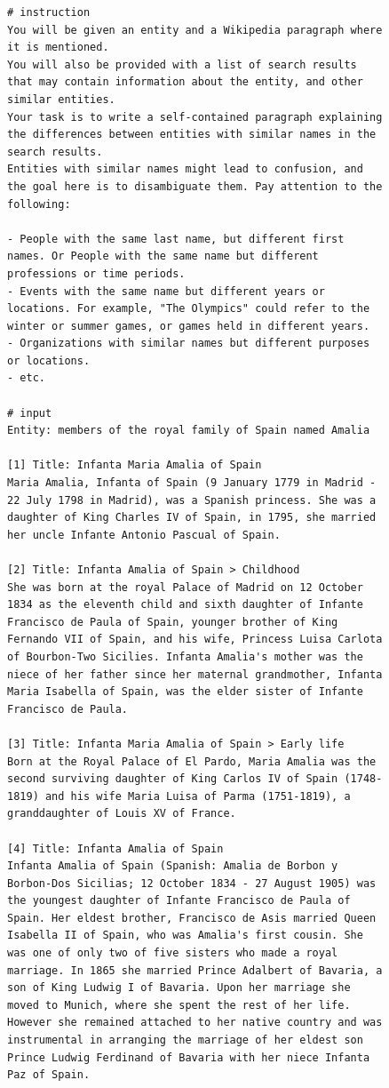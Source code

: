 \begin{figure}[htb]
\begin{lstlisting}
# instruction
You will be given an entity and a Wikipedia paragraph where it is mentioned.
You will also be provided with a list of search results that may contain information about the entity, and other similar entities.
Your task is to write a self-contained paragraph explaining the differences between entities with similar names in the search results.
Entities with similar names might lead to confusion, and the goal here is to disambiguate them. Pay attention to the following:

- People with the same last name, but different first names. Or People with the same name but different professions or time periods.
- Events with the same name but different years or locations. For example, "The Olympics" could refer to the winter or summer games, or games held in different years.
- Organizations with similar names but different purposes or locations.
- etc.

# input
Entity: members of the royal family of Spain named Amalia

[1] Title: Infanta Maria Amalia of Spain
Maria Amalia, Infanta of Spain (9 January 1779 in Madrid - 22 July 1798 in Madrid), was a Spanish princess. She was a daughter of King Charles IV of Spain, in 1795, she married her uncle Infante Antonio Pascual of Spain.

[2] Title: Infanta Amalia of Spain > Childhood
She was born at the royal Palace of Madrid on 12 October 1834 as the eleventh child and sixth daughter of Infante Francisco de Paula of Spain, younger brother of King Fernando VII of Spain, and his wife, Princess Luisa Carlota of Bourbon-Two Sicilies. Infanta Amalia's mother was the niece of her father since her maternal grandmother, Infanta Maria Isabella of Spain, was the elder sister of Infante Francisco de Paula.

[3] Title: Infanta Maria Amalia of Spain > Early life
Born at the Royal Palace of El Pardo, Maria Amalia was the second surviving daughter of King Carlos IV of Spain (1748-1819) and his wife Maria Luisa of Parma (1751-1819), a granddaughter of Louis XV of France.

[4] Title: Infanta Amalia of Spain
Infanta Amalia of Spain (Spanish: Amalia de Borbon y Borbon-Dos Sicilias; 12 October 1834 - 27 August 1905) was the youngest daughter of Infante Francisco de Paula of Spain. Her eldest brother, Francisco de Asis married Queen Isabella II of Spain, who was Amalia's first cousin. She was one of only two of five sisters who made a royal marriage. In 1865 she married Prince Adalbert of Bavaria, a son of King Ludwig I of Bavaria. Upon her marriage she moved to Munich, where she spent the rest of her life. However she remained attached to her native country and was instrumental in arranging the marriage of her eldest son Prince Ludwig Ferdinand of Bavaria with her niece Infanta Paz of Spain.


\end{lstlisting}
\end{figure}
